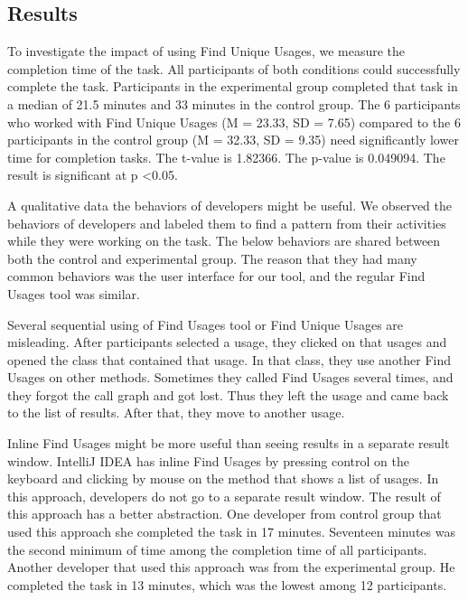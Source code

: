 \documentclass[conference]{IEEEtran}
\begin{document}
\subsection{Results}
To investigate the impact of using Find Unique Usages, we measure the completion time of the task. All participants of both conditions could successfully complete the task. Participants in the experimental group completed that task in a median of 21.5 minutes and 33 minutes in the control group. The 6 participants who worked with Find Unique Usages (M = 23.33, SD = 7.65) compared to the 6 participants in the control group (M = 32.33, SD = 9.35) need significantly lower time for completion tasks. The t-value is 1.82366. The p-value is 0.049094. The result is significant at p \textless 0.05.\par

A qualitative data the behaviors of developers might be useful. We observed the behaviors of developers and labeled them to find a pattern from their activities while they were working on the task. The below behaviors are shared between both the control and experimental group. The reason that they had many common behaviors was the user interface for our tool, and the regular Find Usages tool was similar. \par

Several sequential using of Find Usages tool or Find Unique Usages are misleading. After participants selected a usage, they clicked on that usages and opened the class that contained that usage. In that class, they use another Find Usages on other methods. Sometimes they called Find Usages several times, and they forgot the call graph and got lost. Thus they left the usage and came back to the list of results. After that, they move to another usage. \par

Inline Find Usages might be more useful than seeing results in a separate result window. IntelliJ IDEA has inline Find Usages by pressing control on the keyboard and clicking by mouse on the method that shows a list of usages. In this approach, developers do not go to a separate result window. The result of this approach has a better abstraction. One developer from control group that used this approach she completed the task in 17 minutes. Seventeen minutes was the second minimum of time among the completion time of all participants. Another developer that used this approach was from the experimental group. He completed the task in 13 minutes, which was the lowest among 12 participants. \par
\end{document}
